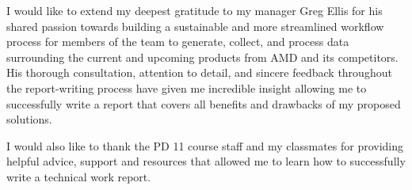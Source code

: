 \documentclass[12pt]{article}
\begin{document}
\indent\hspace{0.5in} I would like to extend my deepest gratitude to my manager Greg Ellis for his shared passion towards building a sustainable and more streamlined workflow process for members of the team to generate, collect, and process data surrounding the current and upcoming products from AMD and its competitors. His thorough consultation, attention to detail, and sincere feedback throughout the report-writing process have given me incredible insight allowing me to successfully write a report that covers all benefits and drawbacks of my proposed solutions.

\indent\hspace{0.5in} I would also like to thank the PD 11 course staff and my classmates for providing helpful advice, support and resources that allowed me to learn how to successfully write a technical work report.
\end{document}
